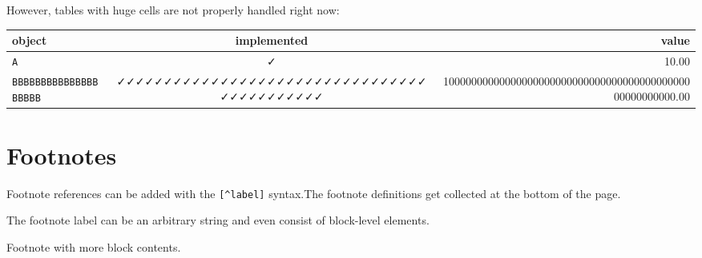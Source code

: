 However, tables with huge cells are not properly handled right now:




\begin{table}[h]
\centering
\begin{tabulary}{\linewidth}{L C R}
\toprule
object & implemented & value \\
\toprule
\texttt{A} & ✓ & 10.00 \\
\texttt{BBBBBBBBBBBBBBBBBBBB} & ✓✓✓✓✓✓✓✓✓✓✓✓✓✓✓✓✓✓✓✓✓✓✓✓✓✓✓✓✓✓✓✓✓✓✓✓✓✓✓✓✓✓✓✓ & 1000000000000000000000000000000000000000000000000000000.00 \\
\bottomrule
\end{tabulary}

\end{table}



\section{Footnotes}



\label{16845496644619434430}{}


Footnote references can be added with the \texttt{[{\textasciicircum}label]} syntax.\footnotemark[1] The footnote definitions get collected at the bottom of the page.



The footnote label can be an arbitrary string and even consist of block-level elements.\footnotemark[2]







Footnote with more block contents.\footnotemark[3]





